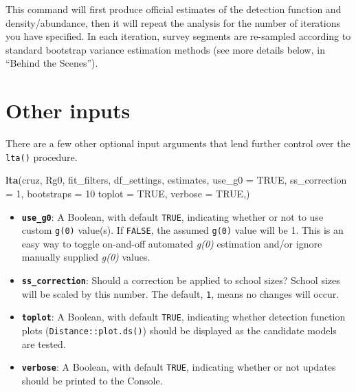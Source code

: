 \documentclass[
]{book}
\newenvironment{Shaded}{\begin{snugshade}}{\end{snugshade}}
\newcommand{\AttributeTok}[1]{\textcolor[rgb]{0.13,0.29,0.53}{#1}}
\newcommand{\ConstantTok}[1]{\textcolor[rgb]{0.56,0.35,0.01}{#1}}
\newcommand{\DecValTok}[1]{\textcolor[rgb]{0.00,0.00,0.81}{#1}}
\newcommand{\FunctionTok}[1]{\textcolor[rgb]{0.13,0.29,0.53}{\textbf{#1}}}
\newcommand{\NormalTok}[1]{#1}
\begin{document}
This command will first produce official estimates of the detection function and density/abundance, then it will repeat the analysis for the number of iterations you have specified. In each iteration, survey segments are re-sampled according to standard bootstrap variance estimation methods (see more details below, in ``Behind the Scenes'').

\hypertarget{other-inputs}{%
\section*{Other inputs}\label{other-inputs}}

There are a few other optional input arguments that lend further control over the \texttt{lta()} procedure.

\begin{Shaded}
\begin{Highlighting}[]
\FunctionTok{lta}\NormalTok{(cruz,}
\NormalTok{    Rg0,}
\NormalTok{    fit\_filters,}
\NormalTok{    df\_settings,}
\NormalTok{    estimates,}
    \AttributeTok{use\_g0 =} \ConstantTok{TRUE}\NormalTok{,}
    \AttributeTok{ss\_correction =} \DecValTok{1}\NormalTok{,}
    \AttributeTok{bootstraps =} \DecValTok{10}
    \AttributeTok{toplot =} \ConstantTok{TRUE}\NormalTok{,}
    \AttributeTok{verbose =} \ConstantTok{TRUE}\NormalTok{,)}
\end{Highlighting}
\end{Shaded}

\begin{itemize}
\item
  \textbf{\texttt{use\_g0}}: A Boolean, with default \texttt{TRUE}, indicating whether or not to use custom \texttt{g(0)} value(s). If \texttt{FALSE}, the assumed \texttt{g(0)} value will be 1. This is an easy way to toggle on-and-off automated \emph{g(0)} estimation and/or ignore manually supplied \emph{g(0)} values.
\item
  \textbf{\texttt{ss\_correction}}: Should a correction be applied to school sizes? School sizes will be scaled by this number. The default, \texttt{1}, means no changes will occur.
\item
  \textbf{\texttt{toplot}}: A Boolean, with default \texttt{TRUE}, indicating whether detection function plots (\texttt{Distance::plot.ds()}) should be displayed as the candidate models are tested.
\item
  \textbf{\texttt{verbose}}: A Boolean, with default \texttt{TRUE}, indicating whether or not updates should be printed to the Console.
\end{itemize}
\end{document}
